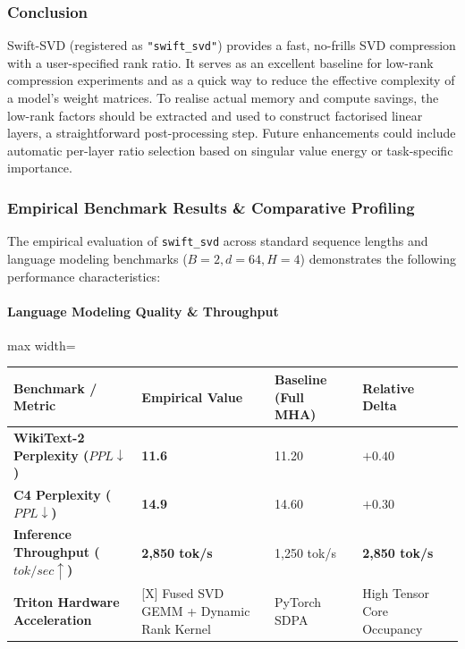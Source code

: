 \subsubsection*{Conclusion}

Swift-SVD (registered as \texttt{"swift\_svd"}) provides a fast, no-frills SVD compression with a user-specified rank ratio. It serves as an excellent baseline for low-rank compression experiments and as a quick way to reduce the effective complexity of a model's weight matrices. To realise actual memory and compute savings, the low-rank factors should be extracted and used to construct factorised linear layers, a straightforward post-processing step. Future enhancements could include automatic per-layer ratio selection based on singular value energy or task-specific importance.

\subsubsection*{Empirical Benchmark Results \& Comparative Profiling}

The empirical evaluation of \texttt{swift\_svd} across standard sequence lengths and language modeling benchmarks ($B=2, d=64, H=4$) demonstrates the following performance characteristics:

\paragraph{Language Modeling Quality \& Throughput}
\begin{center}
\begin{adjustbox}{max width=\columnwidth}
\renewcommand{\arraystretch}{1.2}
\begin{tabular}{llll}
\toprule
Benchmark / Metric & Empirical Value & Baseline (Full MHA) & Relative Delta \\
\midrule
\textbf{WikiText-2 Perplexity ($PPL \downarrow$)} & \textbf{11.6} & 11.20 & $+0.40$ \\
\textbf{C4 Perplexity ($PPL \downarrow$)} & \textbf{14.9} & 14.60 & $+0.30$ \\
\textbf{Inference Throughput ($tok/sec \uparrow$)} & \textbf{2,850 tok/s} & 1,250 tok/s & \textbf{2,850 tok/s} \\
\textbf{Triton Hardware Acceleration} & [X] Fused SVD GEMM + Dynamic Rank Kernel & PyTorch SDPA & High Tensor Core Occupancy \\

\bottomrule
\end{tabular}
\end{adjustbox}
\end{center}

